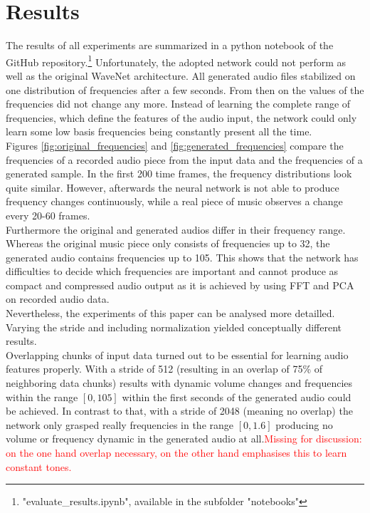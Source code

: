 \documentclass[10pt,conference,compsocconf]{IEEEtran}
\begin{document}
\section{Results}
The results of all experiments are summarized in a python notebook of the GitHub repository.\footnote{"evaluate\_results.ipynb", available in the subfolder "notebooks"} Unfortunately, the adopted network could not perform as well as the original WaveNet architecture. All generated audio files stabilized on one distribution of frequencies after a few seconds. From then on the values of the frequencies did not change any more. Instead of learning the complete range of frequencies, which define the features of the audio input, the network could only learn some low basis frequencies being constantly present all the time.\\
Figures \ref{fig:original_frequencies} and \ref{fig:generated_frequencies} compare the frequencies of a recorded audio piece from the input data and the frequencies of a generated sample. In the first 200 time frames, the frequency distributions look quite similar. However, afterwards the neural network is not able to produce frequency changes continuously, while a real piece of music observes a change every 20-60 frames.\\
Furthermore the original and generated audios differ in their frequency range. Whereas the original music piece only consists of frequencies up to 32, the generated audio contains frequencies up to 105. This shows that the network has difficulties to decide which frequencies are important and cannot produce as compact and compressed audio output as it is achieved by using FFT and PCA on recorded audio data.\\
Nevertheless, the experiments of this paper can be analysed more detailled. Varying the stride and including normalization yielded conceptually different results.\\
Overlapping chunks of input data turned out to be essential for learning audio features properly. With a stride of 512 (resulting in an overlap of 75\% of neighboring data chunks) results with dynamic volume changes and frequencies within the range $[0, 105]$ within the first seconds of the generated audio could be achieved. In contrast to that, with a stride of 2048 (meaning no overlap) the network only grasped really frequencies in the range $[0,1.6]$ producing no volume or frequency dynamic in the generated audio at all.\textcolor{red}{Missing for discussion: on the one hand overlap necessary, on the other hand emphasises this to learn constant tones.}\\
\end{document}
